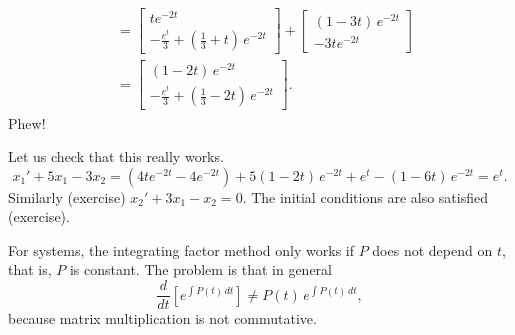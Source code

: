 \documentclass{ximera}
\begin{document}
\begin{exampleSol}
\begin{equation*}
\begin{split}
            & =
            \begin{bmatrix}
                te^{-2t} \\
                -\frac{e^t}{3}+\left( \frac{1}{3} + t \right) \, e^{-2t}
            \end{bmatrix}
            +
            \begin{bmatrix}
                (1-3t)\,e^{-2t} \\
                -3te^{-2t}
            \end{bmatrix} \\
            & =
            \begin{bmatrix}
                (1-2t)\,e^{-2t} \\
                -\frac{e^t}{3}+\left( \frac{1}{3} -2 t \right) \, e^{-2t}
            \end{bmatrix} .
        \end{split}
    \end{equation*}
    Phew!
    
    Let us check that this really works.
    \begin{equation*}
        x_1' + 5 x_1 - 3x_2 = (4te^{-2t} - 4 e^{-2t}) + 5 (1-2t)\,e^{-2t} +e^t-( 1 -6 t ) \, e^{-2t} = e^t .
    \end{equation*}
    Similarly (exercise) $x_2' + 3 x_1 - x_2 = 0$.   The initial conditions are also satisfied (exercise).
\end{exampleSol}

For systems, the integrating factor method only works if $P$ does not depend on $t$, that is, $P$ is constant.  The problem is that in general
\begin{equation*}
    \frac{d}{dt} \left[ e^{\int P(t)\,dt} \right] \not= P(t) \, e^{\int P(t)\,dt} ,
\end{equation*}
because matrix multiplication is not commutative.
\end{document}

